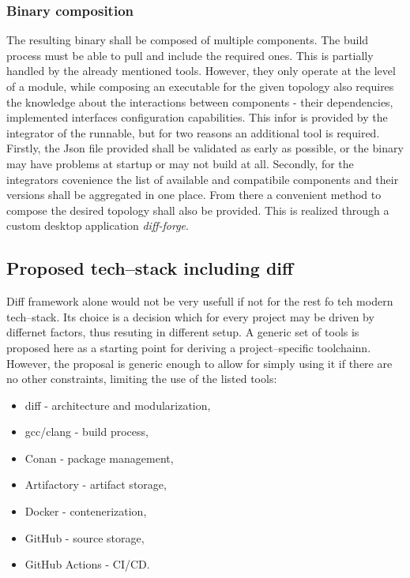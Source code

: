 \documentclass[preprint,12pt, a4paper]{elsarticle}
\begin{document}
\subsubsection{Binary composition}
The resulting binary shall be composed of multiple components. The build process must be able to pull and include the required ones. This is partially handled by the already mentioned tools. However, they only operate at the level of a module, while composing an executable for the given topology also requires the knowledge about the interactions between components - their dependencies, implemented interfaces configuration capabilities. This infor is provided by the integrator of the runnable, but for two reasons an additional tool is required. Firstly, the Json file provided shall be validated as early as possible, or the binary may have problems at startup or may not build at all. Secondly, for the integrators covenience the list of available and compatibile components and their versions shall be aggregated in one place. From there a convenient method to compose the desired topology shall also be provided. This is realized through a custom desktop application \textit{diff-forge}.

\subsection{Proposed tech--stack including diff}
Diff framework alone would not be very usefull if not for the rest fo teh modern tech--stack. Its choice is a decision which for every project may be driven by differnet factors, thus resuting in different setup. A generic set of tools is proposed here as a starting point for deriving a project--specific toolchainn. However, the proposal is generic enough to allow for simply using it if there are no other constraints, limiting the use of the listed tools:
\begin{itemize}
    \item diff - architecture and modularization,
    \item gcc/clang - build process,
    \item Conan - package management,
    \item Artifactory - artifact storage,
    \item Docker - contenerization,
    \item GitHub - source storage,
    \item GitHub Actions - CI/CD.
\end{itemize}
\end{document}
